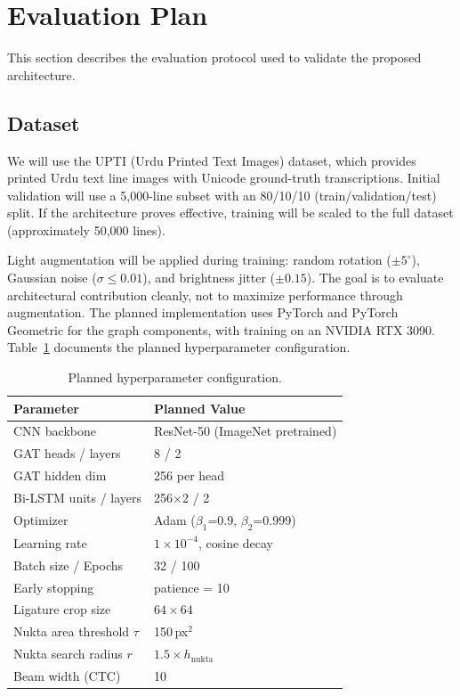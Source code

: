 \documentclass[11pt]{article}
\begin{document}
\section{Evaluation Plan}
\label{sec:eval_plan}

This section describes the evaluation protocol used to validate the proposed architecture.

\subsection{Dataset}

We will use the UPTI (Urdu Printed Text Images) dataset, which provides printed Urdu
text line images with Unicode ground-truth transcriptions.
Initial validation will use a 5{,}000-line subset with an 80/10/10
(train/validation/test) split.
If the architecture proves effective, training will be scaled to the full dataset
(approximately 50{,}000 lines).

Light augmentation will be applied during training: random rotation ($\pm5^{\circ}$),
Gaussian noise ($\sigma \leq 0.01$), and brightness jitter ($\pm0.15$).
The goal is to evaluate architectural contribution cleanly, not to maximize performance
through augmentation.
The planned implementation uses PyTorch and PyTorch Geometric for the graph components,
with training on an NVIDIA RTX 3090.
Table~\ref{tab:hyperparams} documents the planned hyperparameter configuration.

\begin{table}[t]
\centering
\caption{Planned hyperparameter configuration.}
\label{tab:hyperparams}
\begin{tabular}{ll}
\toprule
\textbf{Parameter} & \textbf{Planned Value} \\
\midrule
CNN backbone          & ResNet-50 (ImageNet pretrained) \\
GAT heads / layers    & 8 / 2 \\
GAT hidden dim        & 256 per head \\
Bi-LSTM units / layers & 256$\times$2 / 2 \\
Optimizer             & Adam ($\beta_1$=0.9, $\beta_2$=0.999) \\
Learning rate         & $1\times10^{-4}$, cosine decay \\
Batch size / Epochs   & 32 / 100 \\
Early stopping        & patience = 10 \\
Ligature crop size    & $64\times64$ \\
Nukta area threshold $\tau$ & 150\,px$^2$ \\
Nukta search radius $r$    & $1.5 \times h_{\text{nukta}}$ \\
Beam width (CTC)      & 10 \\
\bottomrule
\end{tabular}
\end{table}
\end{document}
